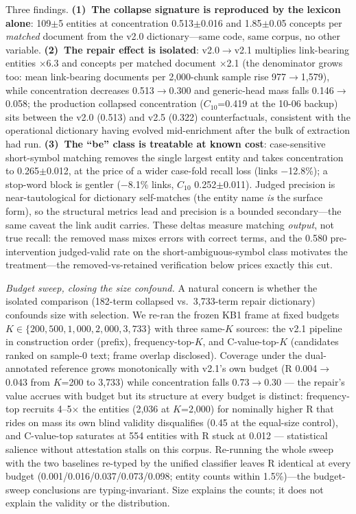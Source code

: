 \documentclass[preprint,12pt]{elsarticle}
\begin{document}
Three findings. \textbf{(1)~The collapse signature is reproduced by the
lexicon alone}: 109$\pm$5 entities at concentration 0.513$\pm$0.016 and
1.85$\pm$0.05 concepts per \emph{matched} document from the v2.0 dictionary---same
code, same corpus, no other variable. \textbf{(2)~The repair effect is
isolated}: v2.0$\to$v2.1 multiplies link-bearing entities $\times$6.3 and
concepts per matched document $\times$2.1 (the denominator grows too:
mean link-bearing documents per 2{,}000-chunk sample rise
977$\to$1{,}579), while concentration decreases 0.513$\to$0.300 and
generic-head mass falls 0.146$\to$0.058; the production collapsed
concentration ($C_{10}$=0.419 at the 10-06 backup) sits between the
v2.0 (0.513) and v2.5 (0.322) counterfactuals,
consistent with the operational dictionary having evolved
mid-enrichment after the bulk of extraction had run.
\textbf{(3)~The ``be'' class is treatable at known cost}: case-sensitive
short-symbol matching removes the single largest entity and takes
concentration to 0.265$\pm$0.012, at the price of a wider case-fold
recall loss (links $-$12.8\%); a stop-word block is
gentler ($-$8.1\% links, $C_{10}$ 0.252$\pm$0.011). Judged
precision is near-tautological for dictionary self-matches (the entity
name \emph{is} the surface form), so the structural metrics lead and
precision is a bounded secondary---the same caveat the link audit
carries. These deltas measure matching \emph{output}, not true
recall: the removed mass mixes errors with correct terms, and the
0.580 pre-intervention judged-valid rate on the short-ambiguous-symbol
class motivates the treatment---the removed-vs-retained verification
below prices exactly this cut.

\emph{Budget sweep, closing the size confound.} A natural
concern is whether the isolated comparison (182-term collapsed
vs.\ 3{,}733-term repair dictionary) confounds size with selection. We re-ran the frozen
KB1 frame at fixed budgets $K \in \{200, 500, 1{,}000, 2{,}000,
3{,}733\}$ with three same-$K$ sources: the v2.1 pipeline in
construction order (prefix), frequency-top-$K$, and C-value-top-$K$
(candidates ranked on sample-0 text; frame overlap disclosed).
Coverage under the dual-annotated reference grows monotonically with
v2.1's own budget (R 0.004$\to$0.043 from $K$=200 to 3{,}733) while
concentration falls 0.73$\to$0.30 --- the repair's value accrues with
budget but its structure at every budget is distinct: frequency-top
recruits 4--5$\times$ the entities (2{,}036 at $K$=2{,}000) for
nominally higher R that rides on mass its own blind validity
disqualifies (0.45 at the equal-size control), and C-value-top
saturates at 554 entities with R stuck at 0.012 --- statistical
salience without attestation stalls on this corpus. Re-running the
whole sweep with the two baselines re-typed by the unified classifier
leaves R identical at every budget (0.001/0.016/0.037/0.073/0.098;
entity counts within 1.5\%)---the budget-sweep conclusions are
typing-invariant. Size explains the
counts; it does not explain the validity or the distribution.
\end{document}
